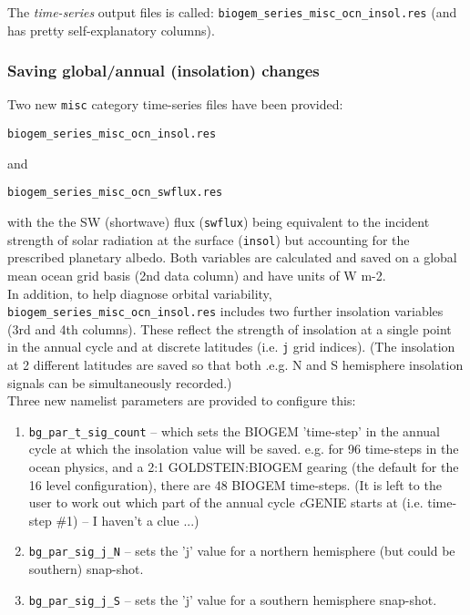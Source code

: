The \textit{time-series} output files is called: \texttt{biogem\_series\_misc\_ocn\_insol.res} (and has pretty self-explanatory columns).

%
\newpage
\subsubsection{Saving global/annual (insolation) changes}
\vspace{1mm}

\vspace{1mm}
Two new \texttt{misc} category time-series files have been provided:
\vspace{-1mm}\begin{verbatim}biogem_series_misc_ocn_insol.res\end{verbatim}\vspace{-1mm}
and
\vspace{-1mm}\begin{verbatim}biogem_series_misc_ocn_swflux.res\end{verbatim}\vspace{-1mm}
with the the SW (shortwave) flux (\texttt{swflux}) being equivalent to the incident strength of solar radiation at the surface (\texttt{insol}) but accounting for the prescribed planetary albedo. Both variables are calculated and saved on a global mean ocean grid basis (2nd data column) and have units of W m-2.
\\In addition, to help diagnose orbital variability, \texttt{biogem\_series\_misc\_ocn\_insol.res} includes two further insolation variables (3rd and 4th columns). These reflect the strength of insolation at a single point in the annual cycle and at discrete latitudes (i.e. \texttt{j} grid indices). (The insolation at 2 different latitudes are saved so that both .e.g. N and S hemisphere insolation signals can be simultaneously recorded.)
\\Three new namelist parameters are provided to configure this:

\begin{enumerate}[noitemsep]

\item \texttt{bg\_par\_t\_sig\_count} -- which sets the BIOGEM 'time-step' in the annual cycle at which the insolation value will be saved. e.g. for 96 time-steps in the ocean physics, and a 2:1 GOLDSTEIN:BIOGEM gearing (the default for the 16 level configuration), there are 48 BIOGEM time-steps. (It is left to the user to work out which part of the annual cycle \textit{c}GENIE starts at (i.e. time-step \#1) -- I haven't a clue ...)

\item \texttt{bg\_par\_sig\_j\_N} -- sets the 'j' value for a northern hemisphere (but could be southern) snap-shot.

\item \texttt{bg\_par\_sig\_j\_S} -- sets the 'j' value for a southern hemisphere snap-shot.

\end{enumerate}

